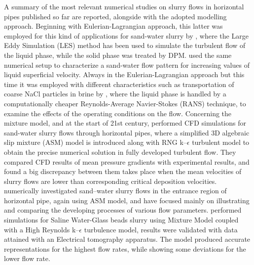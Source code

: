 \documentclass[review,3p,times,12pt]{elsarticle}
\begin{document}
A summary of the most relevant numerical studies on slurry flows in horizontal pipes published so far are reported, alongside with the adopted modelling approach. Beginning with Eulerian-Lagrangian approach, this latter was employed for this kind of applications for sand-water slurry by \citet{Capecelatro-2013}, where the Large Eddy Simulation (LES) method \citet{versteeg2007introduction} has been used to simulate the turbulent flow of the liquid phase, while the solid phase was treated by DPM.  \citet{AROLLA20151} used the same numerical setup to characterize a sand-water flow pattern for increasing values of liquid superficial velocity.  Always in the Eulerian-Lagrangian approach but this time it was employed with different characteristics such as transportation of coarse NaCl particles in brine by \citet{Uzi-2017}, where the liquid phase is handled by a computationally cheaper Reynolds-Average Navier-Stokes (RANS) technique, to examine the effects of the operating conditions on the flow. Concerning the mixture model, and at the start of 21st century, \citet{J-2003} performed CFD simulations for sand-water slurry flows through horizontal pipes, where a simplified 3D algebraic slip mixture (ASM) model is introduced along with RNG k–$\epsilon$ turbulent model to obtain the precise numerical solution in fully developed turbulent flow. They compared CFD results of mean pressure gradients with experimental results, and found a big discrepancy between them takes place when the mean velocities of slurry flows are lower than corresponding critical deposition velocities. \citet{C.X-2008} numerically investigated sand–water slurry flows in the entrance region of horizontal pipe, again using ASM model, and have focused mainly on illustrating and comparing the developing processes of various flow parameters. \citet{Silva-2016} performed simulations for Saline Water-Glass beads slurry using Mixture Model coupled with a High Reynolds k–$\epsilon$ turbulence model, results were validated with data attained with an Electrical tomography apparatus. The model produced accurate representations for the highest flow rates, while showing some deviations for the lower flow rate.
\end{document}

